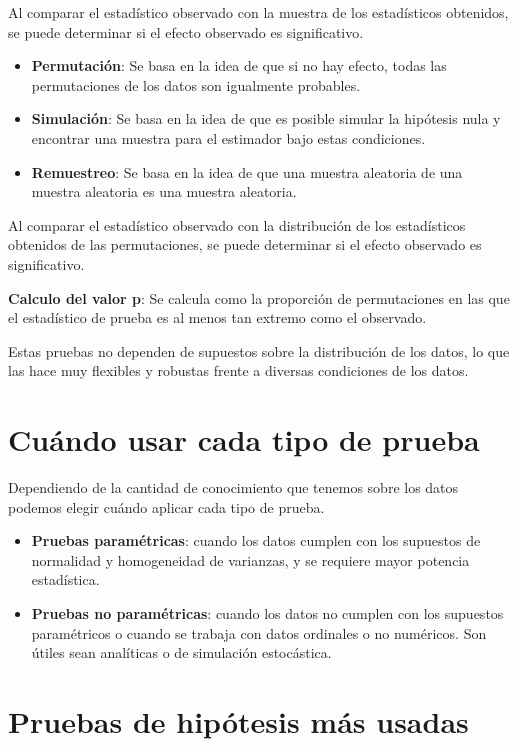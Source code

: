 \documentclass[
  letterpaper,
  DIV=11,
  numbers=noendperiod]{scrreprt}
\begin{document}
Al comparar el estadístico observado con la muestra de los estadísticos
obtenidos, se puede determinar si el efecto observado es significativo.

\begin{itemize}
\item
  \textbf{Permutación}: Se basa en la idea de que si no hay efecto,
  todas las permutaciones de los datos son igualmente probables.
\item
  \textbf{Simulación}: Se basa en la idea de que es posible simular la
  hipótesis nula y encontrar una muestra para el estimador bajo estas
  condiciones.
\item
  \textbf{Remuestreo}: Se basa en la idea de que una muestra aleatoria
  de una muestra aleatoria es una muestra aleatoria.
\end{itemize}

Al comparar el estadístico observado con la distribución de los
estadísticos obtenidos de las permutaciones, se puede determinar si el
efecto observado es significativo.

\textbf{Calculo del valor p}: Se calcula como la proporción de
permutaciones en las que el estadístico de prueba es al menos tan
extremo como el observado.

Estas pruebas no dependen de supuestos sobre la distribución de los
datos, lo que las hace muy flexibles y robustas frente a diversas
condiciones de los datos.

\section{Cuándo usar cada tipo de
prueba}\label{cuuxe1ndo-usar-cada-tipo-de-prueba}

Dependiendo de la cantidad de conocimiento que tenemos sobre los datos
podemos elegir cuándo aplicar cada tipo de prueba.

\begin{itemize}
\item
  \textbf{Pruebas paramétricas}: cuando los datos cumplen con los
  supuestos de normalidad y homogeneidad de varianzas, y se requiere
  mayor potencia estadística.
\item
  \textbf{Pruebas no paramétricas}: cuando los datos no cumplen con los
  supuestos paramétricos o cuando se trabaja con datos ordinales o no
  numéricos. Son útiles sean analíticas o de simulación estocástica.
\end{itemize}

\section{Pruebas de hipótesis más
usadas}\label{pruebas-de-hipuxf3tesis-muxe1s-usadas}
\end{document}
